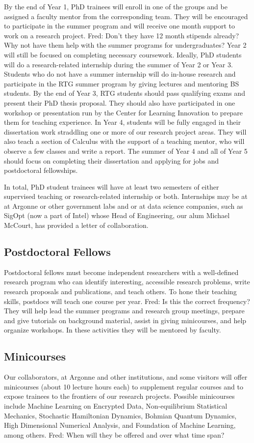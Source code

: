 \documentclass[11pt]{NSFamsart}
\newcommand{\FredNote}[1]{{\color{blue} Fred: #1}}
\begin{document}
By the end of Year 1, PhD trainees will enroll in one of the groups and be assigned a faculty mentor from the corresponding team. They will be encouraged to participate in the summer program and will receive one month support to work on a research project. \FredNote{Don't they have 12 month stipends already?  Why not have them help with the summer programs for undergraduates?} Year 2
will still be focused on completing necessary coursework.
Ideally, PhD students will do a research-related internship during the summer of Year 2 or Year 3. Students who do not have
a summer internship will do in-house research and participate in the RTG summer program
by giving lectures and mentoring BS students. By the end of Year 3, RTG students
should pass qualifying exams and present their PhD thesis proposal. They should also have participated in one   workshop or presentation run by the Center for Learning Innovation to prepare them for teaching experience. In Year 4, students will be fully engaged in their dissertation work straddling one or more of our research project areas. They will also teach a section of Calculus with the support of a teaching
mentor, who will observe a few classes and write a report. The summer of Year 4 and all of Year 5 should focus on completing their dissertation and applying for jobs and postdoctoral fellowships.

In total, PhD student trainees will have at least two semesters of either supervised teaching or research-related internship or both.  Internships may be at at Argonne or other government labs and or at data science companies, such as SigOpt (now a part of Intel) whose Head of Engineering, our alum Michael McCourt, has provided a letter  of collaboration.


\subsection*{Postdoctoral Fellows}
Postdoctoral fellows must become independent researchers with a well-defined research program who can identify interesting, accessible research problems, write research proposals and publications, and teach others.  To hone their teaching skills, postdocs will teach one course per year.  \FredNote{Is this the correct frequency?}  They will help lead the summer programs and research group meetings, prepare and give tutorials on background material, assist in giving minicourses, and help organize workshops.  In these activities they will be mentored by faculty.

\subsection*{Minicourses}
Our collaborators, at Argonne and other institutions, and some visitors will offer minicourses (about 10 lecture hours each) to supplement regular courses and to expose trainees to the frontiers of our research projects. Possible minicourses include  Machine Learning on Encrypted Data,  Non-equilibrium Statistical Mechanics,  Stochastic Hamiltonian Dynamics, Bohmian Quantum Dynamics, High Dimensional Numerical Analysis, and Foundation of Machine Learning, among others. \FredNote{When will they be offered and over what time span?}
\end{document}
